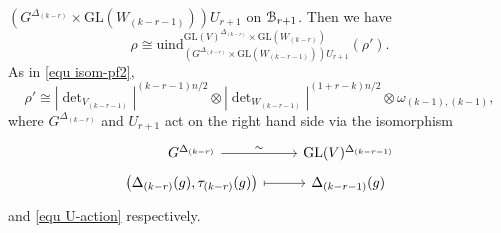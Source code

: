 \documentclass[11pt,reqno]{amsart}
\renewcommand{\1}{{\mathbf{1}}} \newcommand{\sB}{{\mathscr{B}}}
\newcommand{\GL}{{\mathrm{GL}}}\newcommand{\G}{{\mathrm{G}}}
\theoremstyle{plain}
\theoremstyle{definition}
\numberwithin{equation}{section}
\begin{document}
$\left(G^{\Delta_{(k-r)}}\times\GL(W_{(k-r-1)})\right)U_{r+1}$ on  
${\mathcal {B}}_{r+1}$. Then we have
\begin{equation}\label{equ ind-isom'}\rho\cong\mathrm{uind}_{\left(G^{\Delta_{(k-r)}}\times\GL(W_{(k-r-1)})\right)U_{r+1}}^{\GL(V)^{\Delta_{(k-r)}}\times\GL(W_{(k-r)})}(\rho').\end{equation} As in \eqref{equ isom-pf2},
\begin{equation}\label{equ isom-pf2'}\rho'\cong|\det\nolimits_{V_{(k-r-1)}}|^{(k-r-1)n/2}\otimes|\det\nolimits_{W_{(k-r-1)}}|^{(1+r-k)n/2}\otimes\omega_{(k-1),(k-1)},\end{equation} where $G^{\Delta_{(k-r)}}$ and $U_{r+1}$ act on the right hand side via the isomorphism
$$\begin{tikzcd}[row sep=0.1cm]
	G^{\Delta_{(k-r)}} & {\GL(V)^{\Delta_{(k-r-1)}}} \\
	{\left(\Delta_{(k-r)}(g),\tau_{(k-r)}(g)\right)} & {\Delta_{(k-r-1)}(g)}
	\arrow["\sim", from=1-1, to=1-2]
	\arrow[maps to, from=2-1, to=2-2]
\end{tikzcd}$$
and \eqref{equ U-action} respectively.
\end{document}
